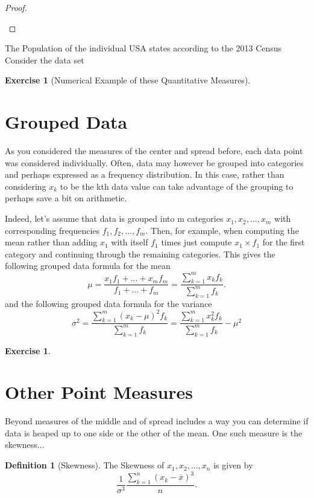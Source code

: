 \documentclass[10pt,]{book}
\theoremstyle{plain}
\theoremstyle{definition}
\newtheorem{definition}[theorem]{Definition}
\theoremstyle{definition}
\theoremstyle{definition}
\newtheorem{exercise}[theorem]{Exercise}
\numberwithin{equation}{section}
\begin{document}
\begin{proof}\hypertarget{proof-4}{}
\end{proof}
\par
The Population of the individual USA states according to the 2013 Census 
Consider the data set {}%
\begin{exercise}[{Numerical Example of these Quantitative Measures}]\label{exercise-1}
\end{exercise}
\typeout{************************************************}
\typeout{************************************************}
\section[{Grouped Data}]{Grouped Data}\label{section-9}
As you considered the measures of the center and spread before, each data point was considered individually. Often, data may however be grouped into categories and perhaps expressed as a frequency distribution. In this case, rather than considering \(x_k\) to be the kth data value can take advantage of the grouping to perhaps save a bit on arithmetic.%
\par
Indeed, let's assume that data is grouped into m categories \(x_1, x_2, ..., x_m\) with corresponding frequencies \(f_1, f_2, ..., f_m\). Then, for example, when computing the mean rather than adding \(x_1\) with itself \(f_1\) times just compute \(x_1 \times f_1\) for the first category and continuing through the remaining categories. This gives the following grouped data formula for the mean
		\begin{equation*}
		\mu = \frac{x_1 f_1 + ... + x_m f_m}{f_1 + ... + f_m} = \frac{\sum_{k=1}^m x_k f_k}{\sum_{k=1}^m f_k}.
		\end{equation*}
and the following grouped data formula for the variance
		\begin{equation*} 
		\sigma^2 = \frac{\sum_{k=1}^m ( x_k-\mu )^2 f_k}{\sum_{k=1}^m f_k} = \frac{\sum_{k=1}^m x_k^2 f_k}{\sum_{k=1}^m f_k} - \mu^2
		\end{equation*}

%
\begin{exercise}\label{exercise-2}
\end{exercise}
\typeout{************************************************}
\typeout{************************************************}
\section[{Other Point Measures}]{Other Point Measures}\label{section-10}
Beyond measures of the middle and of spread includes a way you can determine if data is heaped up to one side or the other of the mean. One such measure is the skewness...
%
\begin{definition}[{Skewness}]\label{definition-15}
The Skewness of \(x_1, x_2, ..., x_n\) is given by
\begin{equation*} \frac{1}{\sigma^3} \frac{\sum_{k=1}^n ( x_k-\overline{x} )^3}{n}.\end{equation*}
%
\end{definition}
\par
\end{document}
